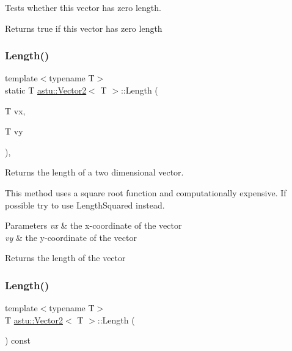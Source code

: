 Tests whether this vector has zero length.

\begin{DoxyReturn}{Returns}
{\ttfamily true} if this vector has zero length 
\end{DoxyReturn}
\mbox{\label{classastu_1_1Vector2_a7fdf839b6c3444121dc6fb2eb88c200e}} 
\subsubsection{\texorpdfstring{Length()}{Length()}\hspace{0.1cm}{\footnotesize\ttfamily [1/2]}}
{\footnotesize\ttfamily template$<$typename T$>$ \\
static T \hyperlink{classastu_1_1Vector2}{astu\+::\+Vector2}$<$ T $>$\+::Length (\begin{DoxyParamCaption}\item[{T}]{vx,  }\item[{T}]{vy }\end{DoxyParamCaption})\hspace{0.3cm}{\ttfamily [inline]}, {\ttfamily [static]}}

Returns the length of a two dimensional vector.

This method uses a square root function and computationally expensive. If possible try to use {\ttfamily Length\+Squared} instead.


\begin{DoxyParams}{Parameters}
{\em vx} & the x-\/coordinate of the vector \\
\hline
{\em vy} & the y-\/coordinate of the vector \\
\hline
\end{DoxyParams}
\begin{DoxyReturn}{Returns}
the length of the vector 
\end{DoxyReturn}
\mbox{\label{classastu_1_1Vector2_ab195006315ba4e54f6e89e01727dbd08}} 
\subsubsection{\texorpdfstring{Length()}{Length()}\hspace{0.1cm}{\footnotesize\ttfamily [2/2]}}
{\footnotesize\ttfamily template$<$typename T$>$ \\
T \hyperlink{classastu_1_1Vector2}{astu\+::\+Vector2}$<$ T $>$\+::Length (\begin{DoxyParamCaption}{ }\end{DoxyParamCaption}) const\hspace{0.3cm}{\ttfamily [inline]}}


